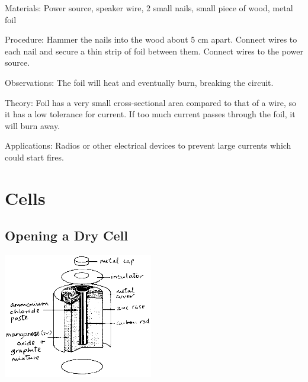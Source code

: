 \begin{multicols}{2}
\begin{description*}
\item[Materials:]{Power source, speaker wire, 2 small nails, small piece of wood, metal foil}
\item[Procedure:]{Hammer the nails into the wood about 5 cm apart. Connect wires to each nail and secure a thin strip of foil between them. Connect wires to the power source.}
\item[Observations:]{The foil will heat and eventually burn, breaking the circuit.}
\item[Theory:]{Foil has a very small cross-sectional area compared to that of a wire, so it has a low tolerance for current. If too much current passes through the foil, it will burn away.}
\item[Applications:]{Radios or other electrical devices to prevent large currents which could start fires.}
\end{description*}


\section*{Cells}


\subsection{Opening a Dry Cell}

\begin{center}
\includegraphics[width=0.49\textwidth]{./img/source/dry-cell-a.png}
\end{center}


\end{multicols}
